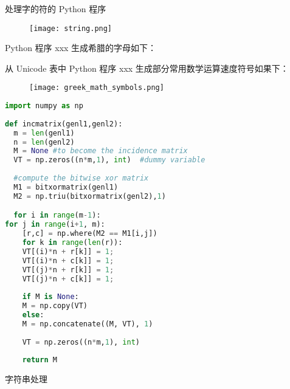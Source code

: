 \documentclass[main.tex]{subfiles}
\begin{document}
处理字的符的 Python 程序

\begin{figure}
	\texttt{[image: string.png]}
\end{figure}

Python 程序 xxx 生成希腊的字母如下：


从 Unicode 表中 Python 程序 xxx 生成部分常用数学运算速度符号如果下：


\begin{figure}
	\texttt{[image: greek\_math\_symbols.png]}
\end{figure}

\begin{lstlisting}[language=Python]
import numpy as np
	
def incmatrix(genl1,genl2):
  m = len(genl1)
  n = len(genl2)
  M = None #to become the incidence matrix
  VT = np.zeros((n*m,1), int)  #dummy variable
	
  #compute the bitwise xor matrix
  M1 = bitxormatrix(genl1)
  M2 = np.triu(bitxormatrix(genl2),1) 

  for i in range(m-1):
for j in range(i+1, m):
  	[r,c] = np.where(M2 == M1[i,j])
	for k in range(len(r)):
	VT[(i)*n + r[k]] = 1;
	VT[(i)*n + c[k]] = 1;
	VT[(j)*n + r[k]] = 1;
	VT[(j)*n + c[k]] = 1;
	
	if M is None:
	M = np.copy(VT)
	else:
	M = np.concatenate((M, VT), 1)
	
	VT = np.zeros((n*m,1), int)
	
	return M
\end{lstlisting}

字符串处理

\newpage
\end{document}
